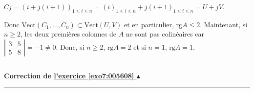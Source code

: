 \documentclass[11pt,a4paper]{article}
\newcounter{exo}
\newcommand{\correction}[1]{\hypertarget{cor7:#1}{}\label{cor7:#1}{\bf Correction de \hyperlink{exo7:#1}{l'exercice \ref{exo7:#1} $\blacktriangle$}}\vspace{1mm}\hrule\vspace{1mm}}
\newcommand{\fincorrection}{\vspace{1mm}\hrule\vspace*{7mm}}
\begin{document}
\begin{center} 
$Cj = (i+j(i+1))_{1\leqslant i\leqslant n}= (i)_{1\leqslant i\leqslant n}+j(i+1)_{1\leqslant i\leqslant n}=U+jV$.
\end{center}

Donc $\text{Vect}(C_1,...,C_n)\subset\text{Vect}(U,V)$ et en particulier, $\text{rg}A\leqslant 2$.
Maintenant, si $n\geqslant 2$, les deux premières colonnes de $A$ ne sont pas colinéaires car $\left|
\begin{array}{cc}
3&5\\
5&8
\end{array}
\right|=-1\neq0$. Donc, si $n\geqslant2$, $\text{rg}A=2$ et si $n=1$, $\text{rg}A =1$.

\begin{center}
\end{center}
\fincorrection
\correction{005608}
\end{document}
